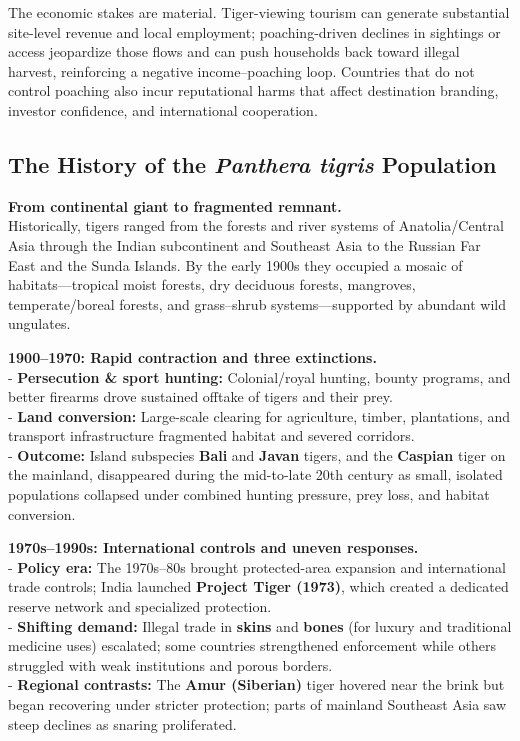 \documentclass[
]{article}
\begin{document}
The economic stakes are material. Tiger-viewing tourism can generate
substantial site-level revenue and local employment; poaching-driven
declines in sightings or access jeopardize those flows and can push
households back toward illegal harvest, reinforcing a negative
income--poaching loop. Countries that do not control poaching also incur
reputational harms that affect destination branding, investor
confidence, and international cooperation.

\subsection{\texorpdfstring{The History of the \emph{Panthera tigris}
Population}{The History of the Panthera tigris Population}}\label{the-history-of-the-panthera-tigris-population}

\textbf{From continental giant to fragmented remnant.}\\
Historically, tigers ranged from the forests and river systems of
Anatolia/Central Asia through the Indian subcontinent and Southeast Asia
to the Russian Far East and the Sunda Islands. By the early 1900s they
occupied a mosaic of habitats---tropical moist forests, dry deciduous
forests, mangroves, temperate/boreal forests, and grass--shrub
systems---supported by abundant wild ungulates.

\textbf{1900--1970: Rapid contraction and three extinctions.}\\
- \textbf{Persecution \& sport hunting:} Colonial/royal hunting, bounty
programs, and better firearms drove sustained offtake of tigers and
their prey.\\
- \textbf{Land conversion:} Large-scale clearing for agriculture,
timber, plantations, and transport infrastructure fragmented habitat and
severed corridors.\\
- \textbf{Outcome:} Island subspecies \textbf{Bali} and \textbf{Javan}
tigers, and the \textbf{Caspian} tiger on the mainland, disappeared
during the mid-to-late 20th century as small, isolated populations
collapsed under combined hunting pressure, prey loss, and habitat
conversion.

\textbf{1970s--1990s: International controls and uneven responses.}\\
- \textbf{Policy era:} The 1970s--80s brought protected-area expansion
and international trade controls; India launched \textbf{Project Tiger
(1973)}, which created a dedicated reserve network and specialized
protection.\\
- \textbf{Shifting demand:} Illegal trade in \textbf{skins} and
\textbf{bones} (for luxury and traditional medicine uses) escalated;
some countries strengthened enforcement while others struggled with weak
institutions and porous borders.\\
- \textbf{Regional contrasts:} The \textbf{Amur (Siberian)} tiger
hovered near the brink but began recovering under stricter protection;
parts of mainland Southeast Asia saw steep declines as snaring
proliferated.
\end{document}
